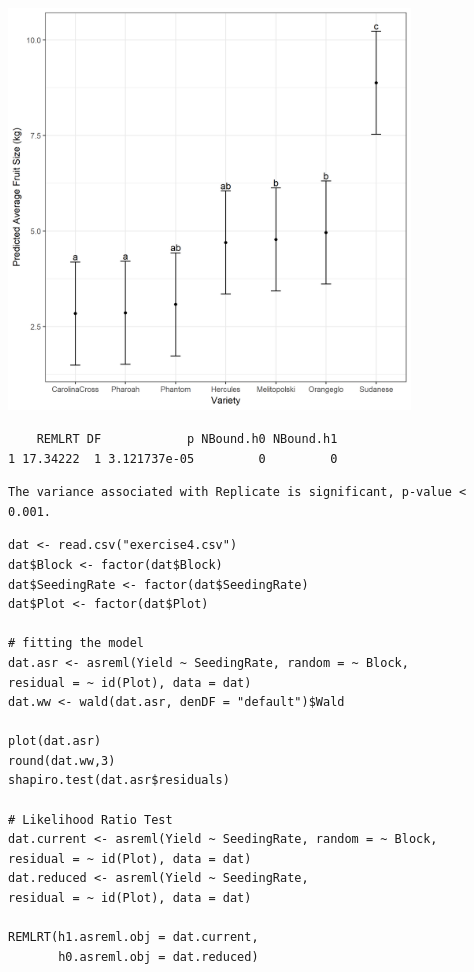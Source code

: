 \documentclass[a4paper, 10pt, fleqn, twosided]{memoir}
\begin{document}
\begin{tcolorbox}[title = Exercise 9 output continued]
\includegraphics[width=0.8\textwidth, frame]{Exercise9Pred.png}
\end{tcolorbox}

\begin{tcolorbox}[title = Exercise 9 output continued]
\begin{verbatim}
    REMLRT DF            p NBound.h0 NBound.h1
1 17.34222  1 3.121737e-05         0         0
\end{verbatim}
\end{tcolorbox}

\begin{tcolorbox}[title = Exercise 9 interpretation]
\begin{verbatim}
The variance associated with Replicate is significant, p-value < 0.001.
\end{verbatim}
\end{tcolorbox}
\begin{tcolorbox}[title = Exercise 10 code]
\begin{verbatim}
dat <- read.csv("exercise4.csv")
dat$Block <- factor(dat$Block)
dat$SeedingRate <- factor(dat$SeedingRate)
dat$Plot <- factor(dat$Plot)

# fitting the model
dat.asr <- asreml(Yield ~ SeedingRate, random = ~ Block,
residual = ~ id(Plot), data = dat)
dat.ww <- wald(dat.asr, denDF = "default")$Wald

plot(dat.asr)
round(dat.ww,3)
shapiro.test(dat.asr$residuals)

# Likelihood Ratio Test
dat.current <- asreml(Yield ~ SeedingRate, random = ~ Block,
residual = ~ id(Plot), data = dat)
dat.reduced <- asreml(Yield ~ SeedingRate,
residual = ~ id(Plot), data = dat)

REMLRT(h1.asreml.obj = dat.current,
       h0.asreml.obj = dat.reduced)
\end{verbatim}
\end{tcolorbox}
\end{document}
